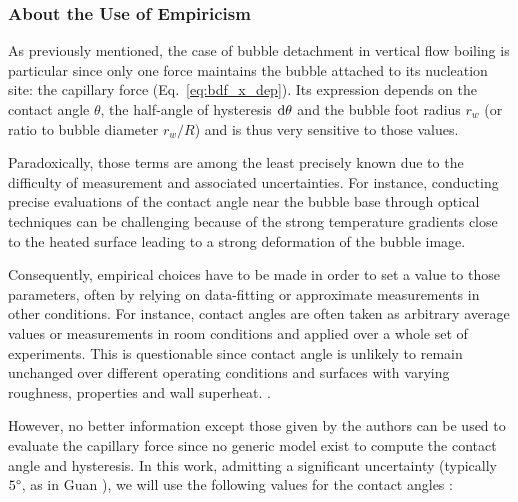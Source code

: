 \subsubsection{About the Use of Empiricism}
 
As previously mentioned, the case of bubble detachment in vertical flow boiling is particular since only one force maintains the bubble attached to its nucleation site: the capillary force (Eq.~\ref{eq:bdf_x_dep}). Its expression depends on the contact angle $\theta$, the half-angle of hysteresis $\mathrm{d}\theta$ and the bubble foot radius $r_{w}$ (or ratio to bubble diameter $r_{w}/R$) and is thus very sensitive to those values. 

Paradoxically, those terms are among the least precisely known due to the difficulty of measurement and associated uncertainties. For instance, conducting precise evaluations of the contact angle near the bubble base through optical techniques can be challenging because of the strong temperature gradients close to the heated surface leading to a strong deformation of the bubble image. 

\npar
Consequently, empirical choices have to be made in order to set a value to those parameters, often by relying on data-fitting or approximate measurements in other conditions. For instance, contact angles are often taken as arbitrary average values \cite{ren_development_2020} or measurements in room conditions \cite{sugrue_modified_2016} and applied over a whole set of experiments. This is questionable since contact angle is unlikely to remain unchanged over different operating conditions and surfaces with varying roughness, properties and wall superheat. \cite{song_temperature_2021}.


\npar
However, no better information except those given by the authors can be used to evaluate the capillary force since no generic model exist to compute the contact angle and hysteresis. In this work, admitting a significant uncertainty (typically $5\degree$, as in Guan \cite{guan_bubble_2015}), we will use the following values for the contact angles :



